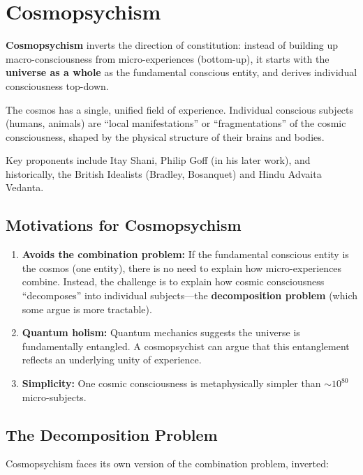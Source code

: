 \documentclass[11pt,a4paper]{report}
\begin{document}
\section{Cosmopsychism}

\begin{varbox}[Cosmopsychism]
\textbf{Cosmopsychism} inverts the direction of constitution: instead of building up macro-consciousness from micro-experiences (bottom-up), it starts with the \textbf{universe as a whole} as the fundamental conscious entity, and derives individual consciousness top-down.

The cosmos has a single, unified field of experience. Individual conscious subjects (humans, animals) are ``local manifestations'' or ``fragmentations'' of the cosmic consciousness, shaped by the physical structure of their brains and bodies.
\end{varbox}

Key proponents include Itay Shani, Philip Goff (in his later work), and historically, the British Idealists (Bradley, Bosanquet) and Hindu Advaita Vedanta.

\subsection{Motivations for Cosmopsychism}

\begin{enumerate}[leftmargin=2em]
  \item \textbf{Avoids the combination problem:} If the fundamental conscious entity is the cosmos (one entity), there is no need to explain how micro-experiences combine. Instead, the challenge is to explain how cosmic consciousness ``decomposes'' into individual subjects---the \textbf{decomposition problem} (which some argue is more tractable).
  \item \textbf{Quantum holism:} Quantum mechanics suggests the universe is fundamentally entangled. A cosmopsychist can argue that this entanglement reflects an underlying unity of experience.
  \item \textbf{Simplicity:} One cosmic consciousness is metaphysically simpler than $\sim 10^{80}$ micro-subjects.
\end{enumerate}

\subsection{The Decomposition Problem}

Cosmopsychism faces its own version of the combination problem, inverted:
\end{document}
